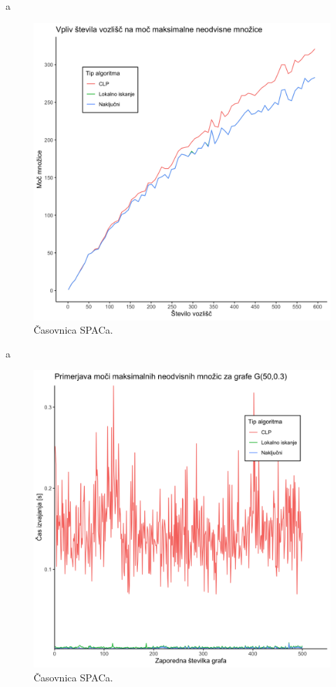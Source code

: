 \documentclass[a4paper, 12pt]{article}
\begin{document}
a
\begin{figure}[h!]
	\begin{center}
		\includegraphics[width=\textwidth]{R_koda/voz-moc.png}
		\caption{Časovnica SPACa.}
	\end{center}
\end{figure}
a
\begin{figure}[h!]
	\begin{center}
		\includegraphics[width=\textwidth]{R_koda/pon-casi.png}
		\caption{Časovnica SPACa.}
	\end{center}
\end{figure}
\end{document}
